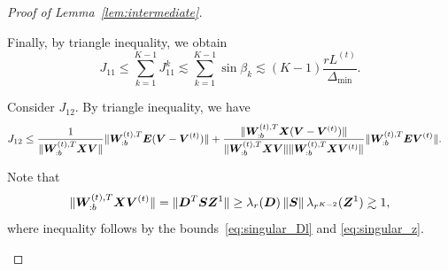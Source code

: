 \documentclass[lettersize,onecolumn,journal]{IEEEtran}
\theoremstyle{definition}
\theoremstyle{definition}
\newcommand{\offf}[1]{\left\{#1\right\}}
\def\fixme#1#2{\textbf{\color{red}[FIXME (#1): #2]}}
\begin{document}
\begin{proof}[Proof of Lemma~\ref{lem:intermediate}]
\begin{enumerate}
    
    Finally, by triangle inequality, we obtain
    \begin{equation}\label{eq:j1}
        J_{11} \leq \sum_{k = 1}^{K-1} J_{11}^k \lesssim  \sum_{k = 1}^{K-1} \sin \beta_k  \lesssim (K-1)\frac{r L^{(t)}}{\Delta_{\min}}.
    \end{equation}
    
    
    Consider $J_{12}$. By triangle inequality, we have 
    \begin{align}
        J_{12} &\leq \frac{ 1}{\lVert\bm{W}_{:b}^{(t),T} \bm X \bm{V} \rVert} \lVert\bm{W}_{:b}^{(t),T} \bm{E} (\bm{V}-\bm{V}^{(t)})\rVert   +
        \frac{ \lVert\bm{W}_{:b}^{(t),T} \bm X (\bm{V}-\bm{V}^{(t)})\rVert }{\lVert\bm{W}_{:b}^{(t),T} \bm X \bm{V} \rVert\lVert\bm{W}_{:b}^{(t),T} \bm X \bm{V}^{(t)} \rVert} \lVert\bm{W}_{:b}^{(t),T} \bm{E} \bm{V}^{(t)} \rVert.
    \end{align}

     Note that 
    \begin{equation}\label{eq:j11_wxvt}
       \onormSize{}{\mW_{:b}^{(t),T} \mX \mV^{(t)}} = \onormSize{}{\mD^T \mS \mZ^1} \geq \lambda_r(\mD) \onorm{\mS} \lambda_{r^{K-2}}(\mZ^1) \gtrsim 1,
    \end{equation}
    where inequality follows by the bounds~\eqref{eq:singular_Dl} and \eqref{eq:singular_z}.
    

\end{enumerate}
\end{proof}
\end{document}
